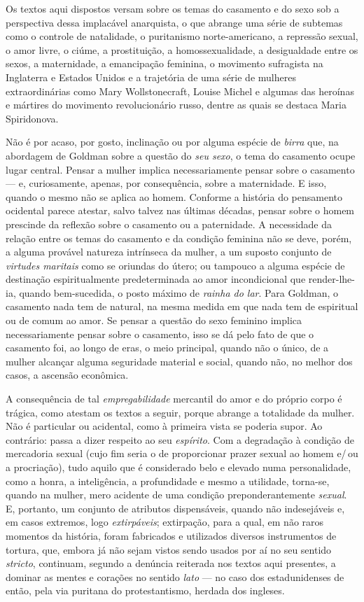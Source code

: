 Os textos aqui dispostos versam sobre os temas do casamento e do sexo
sob a perspectiva dessa implacável anarquista, o que abrange uma série
de subtemas como o controle de natalidade, o puritanismo
norte-americano, a repressão sexual, o amor livre, o ciúme, a
prostituição, a homossexualidade, a desigualdade entre os sexos, a
maternidade, a emancipação feminina, o movimento sufragista na
Inglaterra e Estados Unidos e a trajetória de uma série de mulheres
extraordinárias como Mary Wollstonecraft, Louise Michel e algumas das
heroínas e mártires do movimento revolucionário russo, dentre as quais
se destaca Maria Spiridonova.

Não é por acaso, por gosto, inclinação ou por alguma espécie de
\textit{birra} que, na abordagem de Goldman sobre a questão do \textit{seu sexo},
o tema do casamento ocupe lugar central. Pensar a mulher implica
necessariamente pensar sobre o casamento --- e, curiosamente, apenas, por
consequência, sobre a maternidade. E isso, quando o mesmo não se aplica
ao homem. Conforme a história do pensamento ocidental parece atestar,
salvo talvez nas últimas décadas, pensar sobre o homem prescinde da
reflexão sobre o casamento ou a paternidade. A necessidade da
relação entre os temas do casamento e da condição feminina não se deve,
porém, a alguma provável natureza intrínseca da mulher, a um suposto
conjunto de \textit{virtudes maritais} como se oriundas do útero; ou tampouco
a alguma espécie de destinação espiritualmente predeterminada ao amor
incondicional que render-lhe-ia, quando bem-sucedida, o posto máximo de
\textit{rainha do lar}. Para Goldman, o casamento nada tem de natural, na
mesma medida em que nada tem de espiritual ou de comum ao amor. Se
pensar a questão do sexo feminino implica necessariamente pensar sobre o
casamento, isso se dá pelo fato de que o casamento foi, ao longo de
eras, o meio principal, quando não o único, de a mulher alcançar alguma
seguridade material e social, quando não, no melhor dos casos, a
ascensão econômica.

A consequência de tal \textit{empregabilidade} mercantil do amor e do próprio
corpo é trágica, como atestam os textos a seguir, porque abrange
a totalidade da mulher. Não é particular ou acidental, como à primeira
vista se poderia supor. Ao contrário: passa a dizer respeito ao seu
\textit{espírito}. Com a degradação à condição de mercadoria sexual (cujo
fim seria o de proporcionar prazer sexual ao homem e/\,ou a procriação),
tudo aquilo que é considerado belo e elevado numa personalidade, como a
honra, a inteligência, a profundidade e mesmo a utilidade, torna-se,
quando na mulher, mero acidente de uma condição
preponderantemente \textit{sexual}. E, portanto, um conjunto de atributos
dispensáveis, quando não indesejáveis e, em casos extremos, logo
\textit{extirpáveis}; extirpação, para a qual, em não raros momentos da
história, foram fabricados e utilizados diversos instrumentos de
tortura, que, embora já não sejam vistos sendo usados por aí no seu
sentido \textit{stricto}, continuam, segundo a denúncia reiterada nos
textos aqui presentes, a dominar as mentes e corações no sentido
\textit{lato} --- no caso dos estadunidenses de então, pela via puritana do
protestantismo, herdada dos ingleses. 

